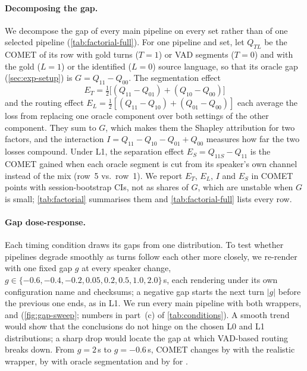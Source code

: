 \paragraph{Decomposing the gap.}
We decompose the gap of every main pipeline on every set rather than of one selected pipeline (\cref{tab:factorial-full}). For one pipeline and set, let $Q_{TL}$ be the COMET of its row with gold turns ($T{=}1$) or VAD segments ($T{=}0$) and with the gold ($L{=}1$) or the identified ($L{=}0$) source language, so that its oracle gap (\cref{sec:exp-setup}) is $G=Q_{11}-Q_{00}$. The segmentation effect
\begin{equation*}
  E_T=\tfrac12\bigl[(Q_{11}-Q_{01})+(Q_{10}-Q_{00})\bigr]
\end{equation*}
and the routing effect $E_L=\tfrac12[(Q_{11}-Q_{10})+(Q_{01}-Q_{00})]$ each average the loss from replacing one oracle component over both settings of the other component. They sum to $G$, which makes them the Shapley attribution for two factors, and the interaction $I=Q_{11}-Q_{10}-Q_{01}+Q_{00}$ measures how far the two losses compound. Under L1, the separation effect $E_S=Q_{11S}-Q_{11}$ is the COMET gained when each oracle segment is cut from its speaker's own channel instead of the mix (row~5 vs.\ row~1). We report $E_T$, $E_L$, $I$ and $E_S$ in COMET points with session-bootstrap CIs, not as shares of $G$, which are unstable when $G$ is small; \cref{tab:factorial} summarises them and \cref{tab:factorial-full} lists every row.



\paragraph{Gap dose-response.}
Each timing condition draws its gaps from one distribution. To test whether pipelines degrade smoothly as turns follow each other more closely, we re-render \taxi with one fixed gap $g$ at every speaker change, $g\in\{-0.6,-0.4,-0.2,0.05,0.2,0.5,1.0,2.0\}$\,s, each rendering under its own configuration name and checksums; a negative gap starts the next turn $|g|$ before the previous one ends, as in L1. We run every main pipeline with both wrappers, and \model (\cref{fig:gap-sweep}; numbers in part~(c) of \cref{tab:conditions}). A smooth trend would show that the conclusions do not hinge on the chosen L0 and L1 distributions; a sharp drop would locate the gap at which VAD-based routing breaks down. From $g=2$\,s to $g=-0.6$\,s, COMET changes by \tbdtext{} with the realistic wrapper, by \tbdtext{} with oracle segmentation and by \tbdtext{} for \model.

